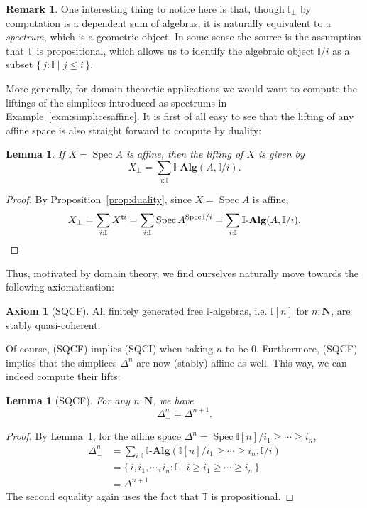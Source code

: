 \documentclass[12pt]{amsart}
\newtheorem{lemma}[theorem]{Lemma}
\theoremstyle{definition}
\newtheorem{remark}[theorem]{Remark}
\newtheorem{axiom}{Axiom}
\newcommand{\mb}[1]{\mathbf{#1}}
\newcommand{\mbb}[1]{\mathbb{#1}}
\newcommand{\T}{\mbb T}
\newcommand{\I}{\mbb I}
\newcommand{\ms}[1]{\mathsf{#1}}
\newcommand{\alg}{\text{-}\mb{Alg}}
\newcommand{\scomp}[2]{\{\,#1\mid#2\,\}}
\newcommand{\N}{\mb N}
\newcommand{\prt}{_{\bot}}
\newcommand{\spec}{\operatorname{Spec}}
\begin{document}
\begin{remark}
  One interesting thing to notice here is that, though $\I\prt$ by computation is a dependent sum of algebras, it is naturally equivalent to a \emph{spectrum}, which is a geometric object. In some sense the source is the assumption that $\T$ is propositional, which allows us to identify the algebraic object $\I/i$ as a subset $\scomp{j : \I}{j \le i}$.
\end{remark}


More generally, for domain theoretic applications we would want to compute the liftings of the simplices introduced as spectrums in Example~\ref{exm:simplicesaffine}. It is first of all easy to see that the lifting of any affine space is also straight forward to compute by duality:

\begin{lemma}\label{lem:liftofaffine}
  If $X = \spec A$ is affine, then the lifting of $X$ is given by
  \[ X\prt = \sum_{i:\I}\I\alg(A,\I/i). \]
\end{lemma}
\begin{proof}
  By Proposition~\ref{prop:duality}, since $X = \spec A$ is affine,
  \[ X\prt = \sum_{i:\I}X^{\ms ti} = \sum_{i:\I}\spec A^{\spec \I/i} = \sum_{i:\I}\I\alg(A,\I/i). \qedhere \]
\end{proof}

Thus, motivated by domain theory, we find ourselves naturally move towards the following axiomatisation:

\begin{axiom}[SQCF]
  All finitely generated free $\I$-algebras, i.e. $\I[n]$ for $n : \N$, are stably quasi-coherent.
\end{axiom}

Of course, (SQCF) implies (SQCI) when taking $n$ to be 0. Furthermore, (SQCF) implies that the simplices $\Delta^n$ are now (stably) affine as well. This way, we can indeed compute their lifts:

\begin{lemma}[SQCF]
  For any $n : \N$, we have
  \[ \Delta^n\prt = \Delta^{n+1}. \]
\end{lemma}
\begin{proof}
  By Lemma~\ref{lem:liftofaffine}, for the affine space $\Delta^n = \spec\I[n]/i_1 \ge \cdots \ge i_n$,
  \begin{align*}
    \Delta^n\prt 
    &= \sum_{i:\I}\I\alg(\I[n]/i_1\ge\cdots\ge i_n,\I/i) \\
    &= \scomp{i,i_1,\cdots,i_n:\I}{i \ge i_1 \ge \cdots \ge i_n} \\
    &= \Delta^{n+1}
  \end{align*}
  The second equality again uses the fact that $\T$ is propositional.
\end{proof}
\end{document}

